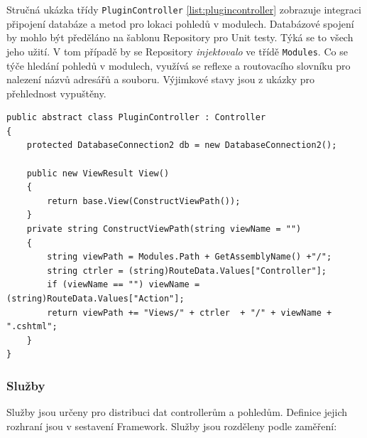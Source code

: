 \documentclass[11pt,twoside,a4paper]{book}
\begin{document}
Stručná ukázka třídy \texttt{PluginController} \ref{list:plugincontroller} zobrazuje integraci připojení databáze a metod pro lokaci pohledů v modulech. Databázové spojení by mohlo být předěláno na šablonu Repository pro Unit testy. Týká se to všech jeho užití. V tom případě by se Repository \textit{injektovalo} ve třídě \texttt{Modules}. Co se týče hledání pohledů v modulech, využívá se reflexe a routovacího slovníku pro nalezení názvů adresářů a souboru. Výjimkové stavy jsou z ukázky pro přehlednost vypuštěny.

\begin{lstlisting}[float=h!,language=CSharp, caption={třída PluginController}, label=list:plugincontroller]
public abstract class PluginController : Controller
{
	protected DatabaseConnection2 db = new DatabaseConnection2();

    public new ViewResult View()
    {
        return base.View(ConstructViewPath());
    }
    private string ConstructViewPath(string viewName = "")
    {
        string viewPath = Modules.Path + GetAssemblyName() +"/";
        string ctrler = (string)RouteData.Values["Controller"];
        if (viewName == "") viewName = (string)RouteData.Values["Action"];
        return viewPath += "Views/" + ctrler  + "/" + viewName + ".cshtml";
    }   
}
\end{lstlisting}

\subsubsection{Služby}
\label{sec:services}
Služby jsou určeny pro distribuci dat controllerům a pohledům. Definice jejich rozhraní jsou v sestavení Framework. Služby jsou rozděleny podle zaměření:
\end{document}
